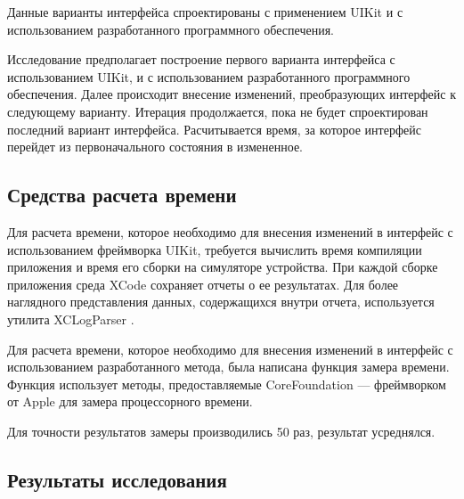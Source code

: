 Данные варианты интерфейса спроектированы с применением UIKit и с использованием разработанного программного обеспечения.


Исследование предполагает построение первого варианта интерфейса с использованием UIKit, и с использованием разработанного программного обеспечения.
Далее происходит внесение изменений, преобразующих интерфейс к следующему варианту.
Итерация продолжается, пока не будет спроектирован последний вариант интерфейса.
Расчитывается время, за которое интерфейс перейдет из первоначального состояния в измененное. 

\subsection{Средства расчета времени}

Для расчета времени, которое необходимо для внесения изменений в интерфейс с использованием фреймворка UIKit, требуется вычислить время компиляции приложения и время его сборки на симуляторе устройства.
При каждой сборке приложения среда XCode сохраняет отчеты о ее результатах.
Для более наглядного представления данных, содержащихся внутри отчета, используется утилита XCLogParser \cite{log}.

Для расчета времени, которое необходимо для внесения изменений в интерфейс с использованием разработанного метода, была написана функция замера времени. 
Функция использует методы, предоставляемые CoreFoundation \cite{corefoundation} ---  фреймворком от Apple для замера процессорного времени.

Для точности результатов замеры производились 50 раз, результат усреднялся.

\subsection{Результаты исследования}

